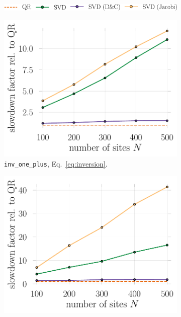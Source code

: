 \documentclass[submission, Phys]{SciPost}
\begin{document}
\begin{figure}
	\centering
	\begin{subfigure}{0.98\textwidth}
		\centering
		\includegraphics[width=.65\textwidth]{figures/legend_dashed.pdf}
		\vspace{5pt}
	\end{subfigure}
	\begin{subfigure}{0.48\textwidth}
			\includegraphics[width=\textwidth]{figures/benchmark_fact_inv_one_plus.pdf}
		\caption{\texttt{inv\_one\_plus}, Eq.~\eqref{eq:inversion}. \label{fig:greens_benchmark_regularinv}}
	\end{subfigure}%
	\hspace{10pt}
	\begin{subfigure}{0.48\textwidth}
		\includegraphics[width=\textwidth]{figures/benchmark_fact_inv_one_plus_loh.pdf}

\end{subfigure}
\end{figure}
\end{document}
